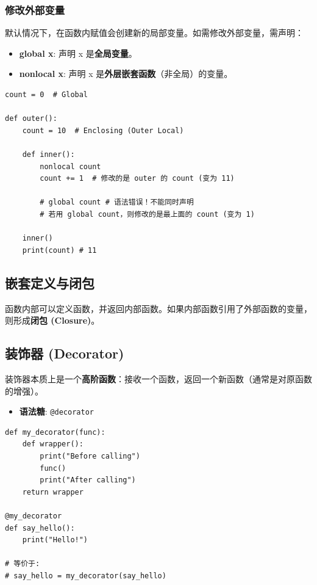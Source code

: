 \documentclass[12pt, a4paper]{article}
\begin{document}
\subsubsection{修改外部变量}
默认情况下，在函数内赋值会创建新的局部变量。如需修改外部变量，需声明：

\begin{itemize}
    \item \textbf{global x}: 声明 x 是\textbf{全局变量}。
    \item \textbf{nonlocal x}: 声明 x 是\textbf{外层嵌套函数}（非全局）的变量。
\end{itemize}

\begin{lstlisting}[caption={global vs nonlocal}]
count = 0  # Global

def outer():
    count = 10  # Enclosing (Outer Local)
    
    def inner():
        nonlocal count 
        count += 1  # 修改的是 outer 的 count (变为 11)
        
        # global count # 语法错误！不能同时声明
        # 若用 global count，则修改的是最上面的 count (变为 1)
        
    inner()
    print(count) # 11
\end{lstlisting}

\subsection{嵌套定义与闭包}
函数内部可以定义函数，并返回内部函数。如果内部函数引用了外部函数的变量，则形成\textbf{闭包 (Closure)}。

\subsection{装饰器 (Decorator)}

装饰器本质上是一个\textbf{高阶函数}：接收一个函数，返回一个新函数（通常是对原函数的增强）。

\begin{itemize}
    \item \textbf{语法糖}: \texttt{@decorator}
\end{itemize}

\begin{lstlisting}[caption={Decorator 原理}]
def my_decorator(func):
    def wrapper():
        print("Before calling")
        func()
        print("After calling")
    return wrapper

@my_decorator
def say_hello():
    print("Hello!")

# 等价于:
# say_hello = my_decorator(say_hello)
\end{lstlisting}
\end{document}
